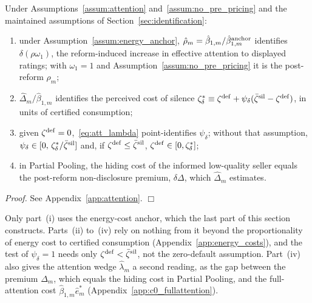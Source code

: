 \begin{proposition}
\label{prop:att_identification}
Under Assumptions~\ref{assum:attention} and~\ref{assum:no_pre_pricing} and the maintained assumptions of Section~\ref{sec:identification}:
\begin{enumerate}[label=(\roman*)]
    \item under Assumption~\ref{assum:energy_anchor}, $\hat\rho_m=\hat\beta_{1,m}/\hat\beta^{\rm anchor}_{1,m}$ identifies $\delta(\rho\omega_1)$, the reform-induced increase in effective attention to displayed ratings; with $\omega_1=1$ and Assumption~\ref{assum:no_pre_pricing} it is the post-reform $\rho_m$;
    \item $\hat\Delta_m/\hat\beta_{1,m}$ identifies the perceived cost of silence $\zeta^*_\delta\equiv \zeta^{\rm def}+\psi_\delta(\bar \zeta^{\rm sil}-\zeta^{\rm def})$, in units of certified consumption;
    \item given $\zeta^{\rm def}=0$,~\eqref{eq:att_lambda} point-identifies $\psi_\delta$; without that assumption, $\psi_\delta\in[0,\,\zeta^*_\delta/\bar \zeta^{\rm sil}]$ and, if $\zeta^{\rm def}\le\bar \zeta^{\rm sil}$, $\zeta^{\rm def}\in[0,\zeta^*_\delta]$;
    \item in Partial Pooling, the hiding cost of the informed low-quality seller equals the post-reform non-disclosure premium, $\delta\Delta$, which $\hat\Delta_m$ estimates.
\end{enumerate}
\end{proposition}

\noindent\textit{Proof.} See Appendix~\ref{app:attention}. $\Box$

Only part~(i) uses the energy-cost anchor, which the last part of this section constructs. Parts~(ii) to~(iv) rely on nothing from it beyond the proportionality of energy cost to certified consumption (Appendix~\ref{app:energy_costs}), and the test of $\psi_\delta=1$ needs only $\zeta^{\rm def}<\bar\zeta^{\rm sil}$, not the zero-default assumption. Part~(iv) also gives the attention wedge $\hat\lambda_m$ a second reading, as the gap between the premium $\Delta_m$, which equals the hiding cost in Partial Pooling, and the full-attention cost $\hat\beta_{1,m}\hat e^*_m$ (Appendix~\ref{app:c0_fullattention}).

